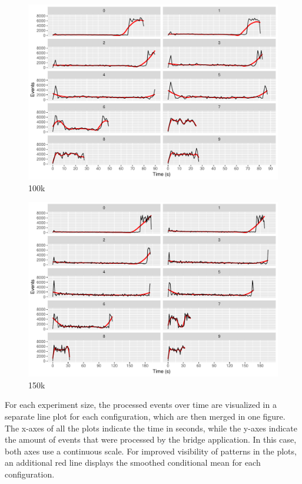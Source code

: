 \begin{figure}[htb]
        \includegraphics[width=\textwidth]{gfx/config-comparison_100k.pdf}
        \caption{100k}
        \label{fig:evaluation:performance:config-comparison_100k}
\end{figure}

\begin{figure}[htb]
        \includegraphics[width=\textwidth]{gfx/config-comparison_150k.pdf}
        \caption{150k}
        \label{fig:evaluation:performance:config-comparison_150k}
\end{figure}

For each experiment size, the processed events over time are visualized in a separate line plot for each configuration, which are then merged in one figure.
The x-axes of all the plots indicate the time in seconds, while the y-axes indicate the amount of events that were processed by the bridge application.
In this case, both axes use a continuous scale.
For improved visibility of patterns in the plots, an additional red line displays the smoothed conditional mean for each configuration.

